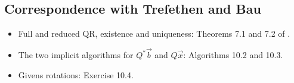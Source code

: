 \subsection{Correspondence with Trefethen and Bau}

\begin{itemize}
  \item Full and reduced QR, existence and uniqueness: Theorems 7.1 and 7.2 of \cite{TB}.
  \item The two implicit algorithms for $Q^\ast\vec{b}$ and $Q\vec{x}$: Algorithms 10.2 and 10.3.
  \item Givens rotations: Exercise 10.4.
\end{itemize}
